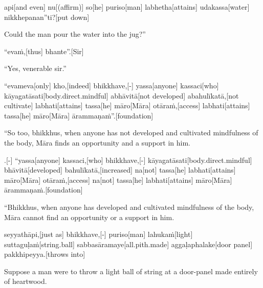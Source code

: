 \begin{samepage}
\begingl[glneveryline={\PaliGlossA,\PaliGlossB}]
api[and even] nu[(affirm)] so[he] puriso[man] labhetha[attains] udakassa[water] nikkhepanan”ti?[put down]
\endgl
\nopagebreak
\linespread{0.5}
\begin{spacin}{0.2}
{\PaliGlossFT Could the man pour the water into the jug?”}
\end{spacin}
\vskip 12pt
\end{samepage}
\begin{samepage}
\begingl[glneveryline={\PaliGlossA,\PaliGlossB}]
“evaṁ,[thus] bhante”.[Sir]
\endgl
\nopagebreak
\linespread{0.5}
\begin{spacin}{0.2}
{\PaliGlossFT “Yes, venerable sir.”}
\end{spacin}
\vskip 12pt
\end{samepage}
\begin{samepage}
\begingl[glneveryline={\PaliGlossA,\PaliGlossB}]
“evameva[only] kho,[indeed] bhikkhave,[-] yassa[anyone] kassaci[who] kāyagatāsati[body.direct.mindful] abhāvitā[not developed] abahulīkatā,[not cultivate] labhati[attains] tassa[he] māro[Māra] otāraṁ,[access] labhati[attains] tassa[he] māro[Māra] ārammaṇaṁ”.[foundation]
\endgl
\nopagebreak
\linespread{0.5}
\begin{spacin}{0.2}
{\PaliGlossFT “So too, bhikkhus, when anyone has not developed and cultivated mindfulness of the body, Māra finds an opportunity and a support in him.}
\end{spacin}
\vskip 12pt
\end{samepage}
\begin{samepage}
.[-] “yassa[anyone] kassaci,[who] bhikkhave,[-] kāyagatāsati[body.direct.mindful] bhāvitā[developed] bahulīkatā,[increased] na[not] tassa[he] labhati[attains] māro[Māra] otāraṁ,[access] na[not] tassa[he] labhati[attains] māro[Māra] ārammaṇaṁ.[foundation]
\endgl
\nopagebreak
\linespread{0.5}
\begin{spacin}{0.2}
{\PaliGlossFT “Bhikkhus, when anyone has developed and cultivated mindfulness of the body, Māra cannot find an opportunity or a support in him.}
\end{spacin}
\vskip 12pt
\end{samepage}
\begin{samepage}
\begingl[glneveryline={\PaliGlossA,\PaliGlossB}]
seyyathāpi,[just as] bhikkhave,[-] puriso[man] lahukaṁ[light] suttaguḷaṁ[string.ball] sabbasāramaye[all.pith.made] aggaḷaphalake[door panel] pakkhipeyya.[throws into]
\endgl
\nopagebreak
\linespread{0.5}
\begin{spacin}{0.2}
{\PaliGlossFT Suppose a man were to throw a light ball of string at a door-panel made entirely of heartwood.}
\end{spacin}
\vskip 12pt
\end{samepage}
